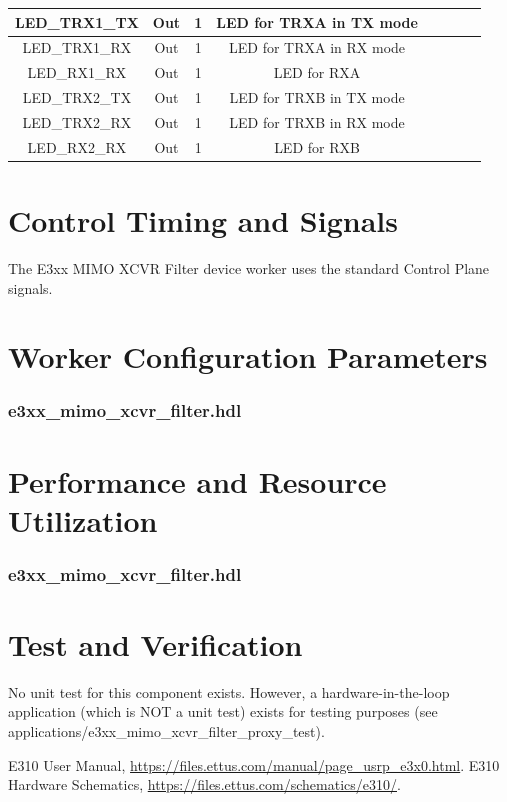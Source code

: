 \documentclass{article}
\def\comp{e3xx\_mimo\_xcvr\_filter}
\def\comp{e3xx\_mimo\_xcvr\_filter}
\edef\ecomp{e3xx_mimo_xcvr_filter}
\begin{document}
\begin{landscape}
\begin{scriptsize}
\begin{tabular}{|c|c|c|c|p{2.6cm}|c|c|c|}
			\hline
			LED\_TRX1\_TX     & Out & 1     & LED for TRXA in TX mode   \\
			\hline
			LED\_TRX1\_RX     & Out & 1     & LED for TRXA in RX mode   \\
			\hline
			LED\_RX1\_RX      & Out & 1     & LED for RXA \\
			\hline
			LED\_TRX2\_TX     & Out & 1     & LED for TRXB in TX mode   \\
			\hline
			LED\_TRX2\_RX     & Out & 1     & LED for TRXB in RX mode   \\
			\hline
			LED\_RX2\_RX      & Out & 1     & LED for RXB \\
			\hline
		\end{tabular}
	\end{scriptsize}
\end{landscape}

\section*{Control Timing and Signals}
The E3xx MIMO XCVR Filter device worker uses the standard Control Plane signals.

\begin{landscape}
\section*{Worker Configuration Parameters}
\subsubsection*{\comp.hdl}

\section*{Performance and Resource Utilization}
\subsubsection*{\comp.hdl}

\end{landscape}

\section*{Test and Verification}
No unit test for this component exists. However, a hardware-in-the-loop application (which is NOT a unit test) exists for testing purposes (see applications/e3xx\_mimo\_xcvr\_filter\_proxy\_test).

\begin{thebibliography}{2}
  E310 User Manual,
  \url{https://files.ettus.com/manual/page\_usrp\_e3x0.html}.
  E310 Hardware Schematics,
  \url{https://files.ettus.com/schematics/e310/}.
\end{thebibliography}
\end{document}
